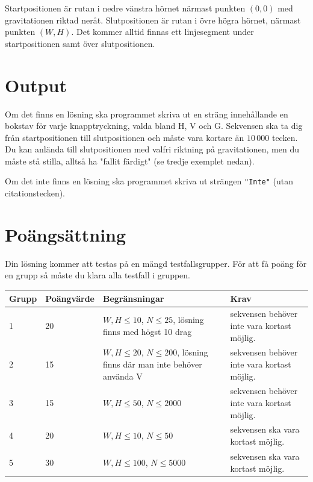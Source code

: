 Startpositionen är rutan i nedre vänstra hörnet närmast punkten $(0,0)$ med gravitationen riktad neråt. Slutpositionen är rutan i övre högra hörnet, närmast punkten $(W,H)$. Det kommer alltid finnas ett linjesegment under startpositionen samt över slutpositionen.


\section*{Output}
Om det finns en lösning ska programmet skriva ut en sträng innehållande en bokstav för varje knapptryckning, valda bland H, V och G. Sekvensen ska ta dig från startpositionen till slutpositionen och måste vara kortare än $10\,000$ tecken. Du kan anlända till slutpositionen med valfri riktning på gravitationen, men du måste stå stilla, alltså ha "fallit färdigt" (se tredje exemplet nedan).

Om det inte finns en lösning ska programmet skriva ut strängen \texttt{"Inte"} (utan citationstecken).

\section*{Poängsättning}
Din lösning kommer att testas på en mängd testfallsgrupper. För att få poäng för en grupp så måste du klara alla testfall i gruppen.

\begin{tabular}{| l | l | p{5cm} | p{5cm} |}
	\hline
	Grupp & Poängvärde & Begränsningar & Krav \\ \hline
  1     & 20  & $W,H \le 10$, $N \le 25$, lösning finns med högst 10 drag & sekvensen behöver inte vara kortast möjlig. \\ \hline
  2     & 15  & $W,H \le 20$, $N \le 200$, lösning finns där man inte behöver använda V & sekvensen behöver inte vara kortast möjlig. \\ \hline
  3     & 15  & $W,H \le 50$, $N \le 2000$ & sekvensen behöver inte vara kortast möjlig. \\ \hline
  4     & 20  & $W,H \le 10$, $N \le 50$ & sekvensen ska vara kortast möjlig. \\ \hline
  5     & 30  & $W,H \le 100$, $N \le 5000$ & sekvensen ska vara kortast möjlig. \\ \hline
\end{tabular}

